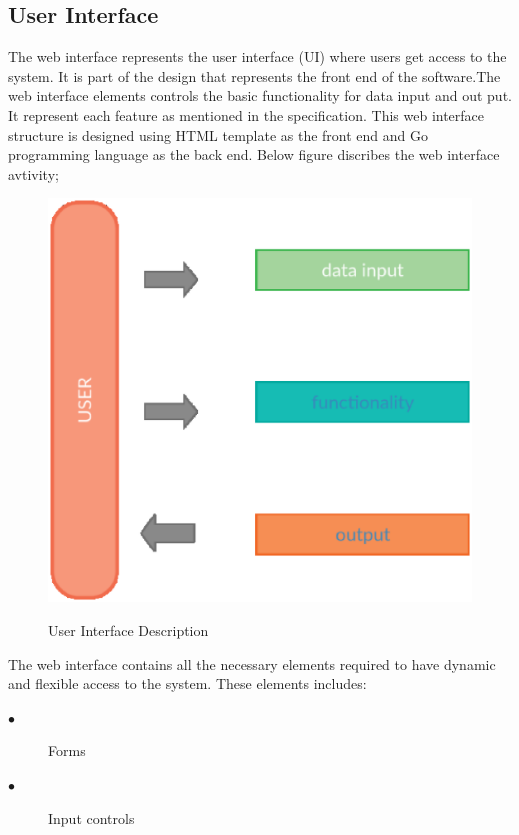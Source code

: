 \subsection{User Interface}
The web interface represents the user interface (UI) where users get access to the system. It is part of the design that represents the front end of the software.The web interface elements controls the basic functionality for data input and out put. It represent each feature as mentioned in the specification. This web interface structure is designed using  HTML template as the front end and Go programming language as the back end. Below figure discribes the web interface avtivity;

\begin{figure}[h!]
\includegraphics[width = \linewidth]{userinterface.eps}
\label{fig:Web Interface Activity} 
\caption{User Interface Description}
\end{figure}


 The web interface contains all the necessary elements required to have dynamic and flexible access to the system. These elements includes:
\begin{description}
  \item[$\bullet$] Forms
  \item[$\bullet$] Input controls
\end{description}
